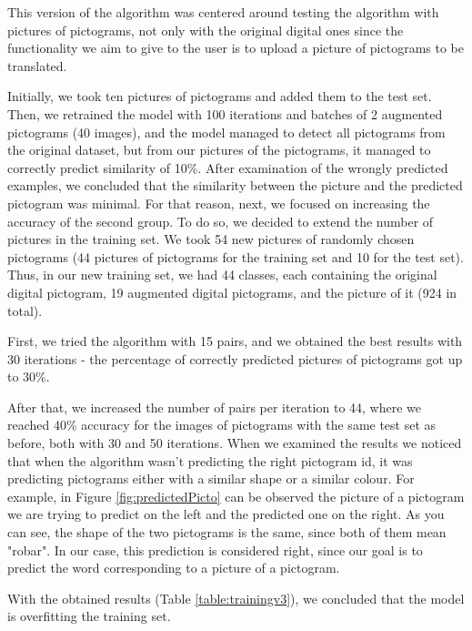 This version of the algorithm was centered around testing the algorithm with pictures of pictograms, not only with the original digital ones since the functionality we aim to give to the user is to upload a picture of pictograms to be translated.

Initially, we took ten pictures of pictograms and added them to the test set. Then, we retrained the model with 100 iterations and batches of 2 augmented pictograms (40 images), and the model managed to detect all pictograms from the original dataset, but from our pictures of the pictograms, it managed to correctly predict similarity of 10\%. After examination of the wrongly predicted examples, we concluded that the similarity between the picture and the predicted pictogram was minimal. For that reason, next, we focused on increasing the accuracy of the second group. To do so, we decided to extend the number of pictures in the training set. We took 54 new pictures of randomly chosen pictograms (44 pictures of pictograms for the training set and 10 for the test set). Thus, in our new training set, we had 44 classes, each containing the original digital pictogram, 19 augmented digital pictograms, and the picture of it (924 in total).

First, we tried the algorithm with 15 pairs, and we obtained the best results with 30 iterations - the percentage of correctly predicted pictures of pictograms got up to 30\%.

After that, we increased the number of pairs per iteration to 44, where we reached 40\% accuracy for the images of pictograms with the same test set as before, both with 30 and 50 iterations. When we examined the results we noticed that when the algorithm wasn't predicting the right pictogram id, it was predicting pictograms either with a similar shape or a similar colour. For example, in Figure \ref{fig:predictedPicto} can be observed the picture of a pictogram we are trying to predict on the left and the predicted one on the right. As you can see, the shape of the two pictograms is the same, since both of them mean "robar". In our case, this prediction is considered right, since our goal is to predict the word corresponding to a picture of a pictogram. 

With the obtained results (Table \ref{table:trainingv3}), we concluded that the model is overfitting the training set.

